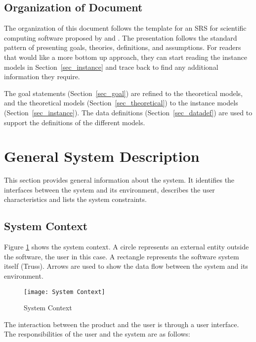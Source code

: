 \documentclass[12pt]{article}
\begin{document}
\subsection{Organization of Document}
The organization of this document follows the template for an SRS for 
scientific computing software proposed by \cite{SmithandLai2005} and 
\cite{Koothoor2013}. The presentation follows the standard pattern of 
presenting 
goals, theories, definitions, and assumptions. For readers that would like a 
more bottom up approach, they can start reading the instance models in 
Section~\ref{sec_instance} and trace back to find any additional information 
they require.

The goal statements (Section~\ref{sec_goal}) are refined to the theoretical 
models, and the theoretical models (Section~\ref{sec_theoretical}) to the 
instance models (Section~\ref{sec_instance}). The data definitions 
(Section~\ref{sec_datadef}) are used to support the definitions of the 
different models.

\section{General System Description}

This section provides general information about the system.  It identifies the
interfaces between the system and its environment, describes the user
characteristics and lists the system constraints.  

\subsection{System Context}

Figure \ref{Fig_SystemContext} shows the system context. A circle represents an 
external entity outside the software, the user in this case. A rectangle 
represents the software system itself (Truss). Arrows are used to show the data 
flow between the system and its environment. \\

\begin{figure}[h!]
\begin{center}
 \texttt{[image: System Context]}
\caption{System Context}
\label{Fig_SystemContext} 
\end{center}
\end{figure}

The interaction between the product and the user is through a user interface. 
The responsibilities of the user and the system are as follows:
\end{document}
